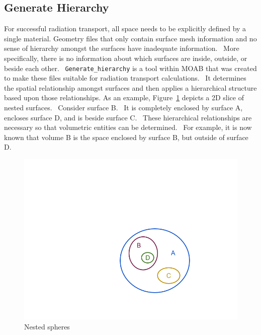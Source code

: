 \subsection{Generate Hierarchy}
For successful radiation transport, all space needs to be explicitly defined by a single material. 
Geometry files that only contain surface mesh information and no sense of hierarchy amongst the surfaces
have inadequate information.  More specifically, there is no information about which surfaces are inside,
outside, or beside each other.  \texttt{Generate\_hierarchy} is a tool within MOAB that was created to
make these files suitable for radiation transport calculations.  It determines the spatial relationship
amongst surfaces and then applies a hierarchical structure based upon those relationships. As an example, 
Figure~\ref{fig:spheres} depicts a 2D slice of nested surfaces.  Consider surface B.  It is completely enclosed by surface A, 
encloses surface D, and is beside surface C.  These hierarchical relationships are necessary so that 
volumetric entities can be determined.  For example, it is now known that volume B is the space enclosed by 
surface B, but outside of surface D.

\begin{figure}
 \begin{centering}
 \centering
 \includegraphics[width=\paperwidth]{../figs/nested_spheres.png}
 \caption{Nested spheres}
 \label{fig:spheres}
 \end{centering}
\end{figure}

